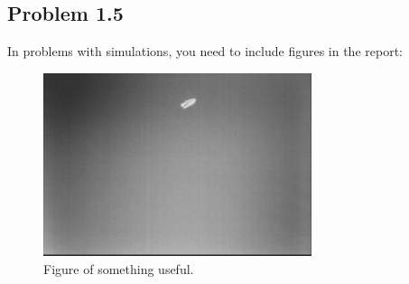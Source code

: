 \subsection{Problem 1.5}
In problems with simulations, you need to include figures in the report:
\begin{figure}[ht]
	\centering
	\includegraphics[width=0.7\textwidth]{fig1} %
	\caption{Figure of something useful.}
	\label{fig:fig1}
\end{figure}

